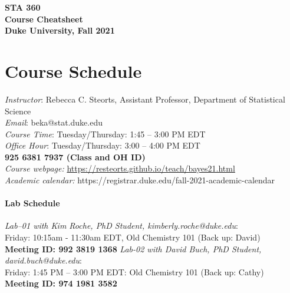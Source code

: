 \documentclass[11pt]{article}
\date{}
\begin{document}
\begin{center}
{\Large\bf STA 360\\ Course Cheatsheet} \\

{\Large\bf Duke University, Fall 2021} \\
\end{center}


\section{Course Schedule}
\emph{Instructor}: Rebecca C. Steorts,  Assistant Professor,  Department of Statistical Science\\
\emph{Email}: beka@stat.duke.edu\\
\emph{Course Time}: Tuesday/Thursday: 1:45 -- 3:00 PM EDT \\
\emph{Office Hour}: Tuesday/Thursday: 3:00 -- 4:00 PM EDT \\
\textbf{925 6381 7937 (Class and OH ID)}\\
\emph{Course webpage:} \url{https://resteorts.github.io/teach/bayes21.html} \\
\emph{Academic calendar:} https://registrar.duke.edu/fall-2021-academic-calendar


\paragraph{Lab Schedule}
\emph{Lab--01 with Kim Roche, PhD Student, kimberly.roche@duke.edu}: \\Friday: 10:15am - 11:30am EDT, Old Chemistry 101 (Back up: David) \\
\textbf{Meeting ID: 992 3819 1368}
\emph{Lab-02 with David Buch, PhD Student, david.buch@duke.edu}: \\Friday: 1:45 PM -- 3:00 PM EDT: Old Chemistry 101 (Back up: Cathy) \\
\textbf{Meeting ID: 974 1981 3582}\\
\end{document}
